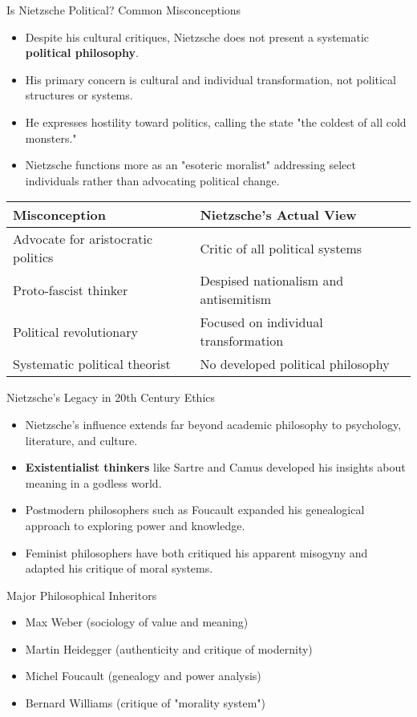 \documentclass{beamer}
\begin{document}
\begin{frame}{Is Nietzsche Political? Common Misconceptions}
\begin{itemize}
\item Despite his cultural critiques, Nietzsche does not present a systematic \textbf{political philosophy}.
\item His primary concern is cultural and individual transformation, not political structures or systems.
\item He expresses hostility toward politics, calling the state "the coldest of all cold monsters."
\item Nietzsche functions more as an "esoteric moralist" addressing select individuals rather than advocating political change.
\end{itemize}

\begin{table}
\begin{tabular}{ll}
\toprule
\textbf{Misconception} & \textbf{Nietzsche's Actual View} \\
\midrule
Advocate for aristocratic politics & Critic of all political systems \\
Proto-fascist thinker & Despised nationalism and antisemitism \\
Political revolutionary & Focused on individual transformation \\
Systematic political theorist & No developed political philosophy \\
\bottomrule
\end{tabular}
\end{table}
\end{frame}

\begin{frame}{Nietzsche's Legacy in 20th Century Ethics}
    \begin{itemize}
    \item Nietzsche's influence extends far beyond academic philosophy to psychology, literature, and culture.
    \item \textbf{Existentialist thinkers} like Sartre and Camus developed his insights about meaning in a godless world.
    \item Postmodern philosophers such as Foucault expanded his genealogical approach to exploring power and knowledge.
    \item Feminist philosophers have both critiqued his apparent misogyny and adapted his critique of moral systems.
    \end{itemize}
    
    \begin{block}{Major Philosophical Inheritors}
    \begin{itemize}
    \item Max Weber (sociology of value and meaning)
    \item Martin Heidegger (authenticity and critique of modernity)
    \item Michel Foucault (genealogy and power analysis)
    \item Bernard Williams (critique of "morality system")
    \end{itemize}
    \end{block}
    \end{frame}
    
\end{document}

